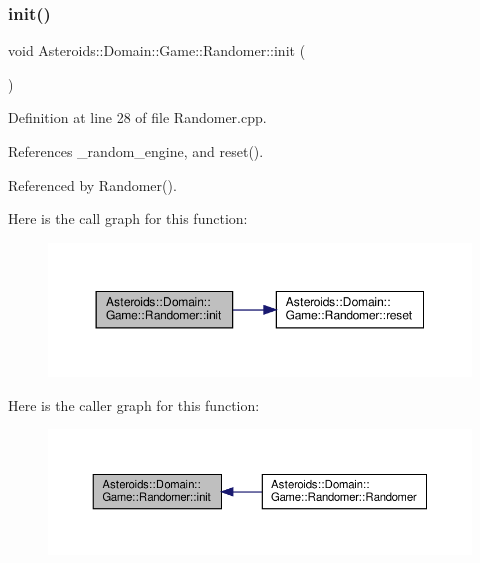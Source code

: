 \subsubsection{\texorpdfstring{init()}{init()}}
{\footnotesize\ttfamily void Asteroids\+::\+Domain\+::\+Game\+::\+Randomer\+::init (\begin{DoxyParamCaption}{ }\end{DoxyParamCaption})\hspace{0.3cm}{\ttfamily [private]}}



Definition at line 28 of file Randomer.\+cpp.



References \+\_\+random\+\_\+engine, and reset().



Referenced by Randomer().

Here is the call graph for this function\+:\nopagebreak
\begin{figure}[H]
\begin{center}
\leavevmode
\includegraphics[width=350pt]{classAsteroids_1_1Domain_1_1Game_1_1Randomer_aaef0f9e57c6743748a2f0b2d944345ee_cgraph}
\end{center}
\end{figure}
Here is the caller graph for this function\+:\nopagebreak
\begin{figure}[H]
\begin{center}
\leavevmode
\includegraphics[width=350pt]{classAsteroids_1_1Domain_1_1Game_1_1Randomer_aaef0f9e57c6743748a2f0b2d944345ee_icgraph}
\end{center}
\end{figure}
\mbox{\label{classAsteroids_1_1Domain_1_1Game_1_1Randomer_af57f0a4d202d7d2b314964231bf5c5b3}} 

